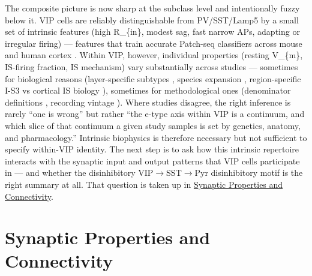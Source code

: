 \documentclass[11pt]{article}
\let\origrightarrow\rightarrow
\def\rightarrow{\ensuremath{\origrightarrow}}
\begin{document}
The composite picture is now sharp at the subclass level and intentionally fuzzy below it. VIP cells are reliably distinguishable from PV/SST/Lamp5 by a small set of intrinsic features (high R\_\{in\}, modest sag, fast narrow APs, adapting or irregular firing) --- features that train accurate Patch-seq classifiers across mouse and human cortex \citep{Gouwens2020a, Gouwens2019, Kim2023, Lee2023a, Ferrante2016}. Within VIP, however, individual properties (resting V\_\{m\}, IS-firing fraction, IS mechanism) vary substantially across studies --- sometimes for biological reasons (layer-specific subtypes \citep{Pronneke2015, Gouwens2020a}, species expansion \citep{Bakken2021a, Chartrand2023}, region-specific I-S3 vs cortical IS biology \citep{Guetmccreight2020b, Michaud2024}), sometimes for methodological ones (denominator definitions \citep{Cauli1997, Cauli2000, Anastasiades2021a}, recording vintage \citep{Bell2015, Michaud2024}). Where studies disagree, the right inference is rarely ``one is wrong'' but rather ``the e-type axis within VIP is a continuum, and which slice of that continuum a given study samples is set by genetics, anatomy, and pharmacology.'' Intrinsic biophysics is therefore necessary but not sufficient to specify within-VIP identity. The next step is to ask how this intrinsic repertoire interacts with the synaptic input and output patterns that VIP cells participate in --- and whether the disinhibitory VIP\rightarrow SST\rightarrow Pyr disinhibitory motif \citep{Pfeffer2013, Pi2013, Karnani2016a} is the right summary at all. That question is taken up in \href{/synaptic-properties}{Synaptic Properties and Connectivity}.


\section{Synaptic Properties and Connectivity}
\label{sec:06_synaptic_properties}
\end{document}
